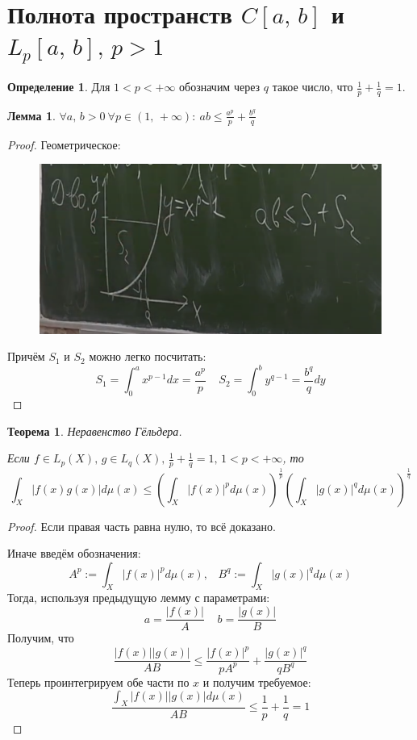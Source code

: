 \documentclass[a4paper,12pt]{article}
\renewcommand{\leq}{\ensuremath{\leqslant}}
\theoremstyle{plain}
\newtheorem{theorem}{Теорема}[section]
\newtheorem{lemma}{Лемма}[section]
\theoremstyle{definition}
\newtheorem{definition}{Определение}[section]
\theoremstyle{remark}
\begin{document}
\section{Полнота пространств $C[a,\,b]$ и $L_p[a,\,b],\, p > 1$}
\begin{definition}
	Для $1 < p < +\infty$ обозначим через $q$ такое число, что $\frac{1}{p} + \frac{1}{q} = 1$.
\end{definition}

\begin{lemma}
	$\forall a,\,b > 0 \: \forall p \in (1,\,+\infty):\: ab \leq \frac{a^p}{p} + \frac{b^q}{q}$
\end{lemma}
\begin{proof}
	Геометрическое:

	\begin{figure}[h]
		\includegraphics[scale=0.5]{img/yung.png}
	\end{figure}

	Причём $S_1$ и $S_2$ можно легко посчитать:
	\[S_1 = \int_0^a x^{p - 1}dx = \frac{a^p}{p}\;\;\;\; S_2 = \int_0^b y^{q - 1} = \frac{b^q}{q}dy\]
\end{proof}

\begin{theorem}
	Неравенство Гёльдера.

	Если $f \in L_p(X),\, g \in L_q(X),\, \frac{1}{p} + \frac{1}{q} = 1,\, 1 < p < +\infty$, то
	\[\int_X |f(x)g(x)|d\mu(x) \leq \left(\int_X |f(x)|^pd\mu(x)\right)^{\frac{1}{p}}\left(\int_X |g(x)|^qd\mu(x)\right)^{\frac{1}{q}}\]
\end{theorem}

\begin{proof}
	Если правая часть равна нулю, то всё доказано.

	Иначе введём обозначения:
	\[A^p := \int_X|f(x)|^pd\mu(x),\;\;\; B^q := \int_X|g(x)|^qd\mu(x)\]
	Тогда, используя предыдущую лемму с параметрами:
	\[a = \frac{|f(x)|}{A}\;\;\;\; b = \frac{|g(x)|}{B}\]
	Получим, что
	\[\frac{|f(x)||g(x)|}{AB} \leq \frac{|f(x)|^p}{pA^p} + \frac{|g(x)|^q}{qB^q}\]
	Теперь проинтегрируем обе части по $x$ и получим требуемое:
	\[\frac{\int_X |f(x)||g(x)|d\mu(x)}{AB} \leq \frac{1}{p} + \frac{1}{q} = 1\]
\end{proof}
\end{document}
